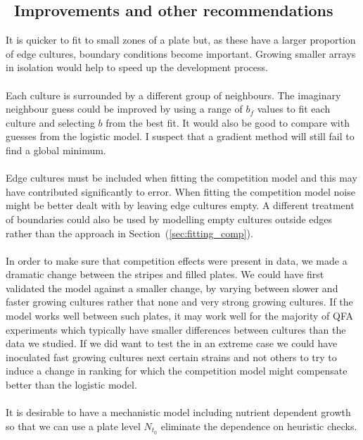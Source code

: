 \subsection{\thesubsection~Improvements and other recommendations}

It is quicker to fit to small zones of a plate but, as these have a
larger proportion of edge cultures, boundary conditions become
important. Growing smaller arrays in isolation would help to speed up
the development process.
\\\\
Each culture is surrounded by a different group of neighbours. The
imaginary neighbour guess could be improved by using a range of
\(b_{f}\) values to fit each culture and selecting \(b\) from the best
fit. It would also be good to compare with guesses from the logistic
model. I suspect that a gradient method will still fail to find a
global minimum.
\\\\
Edge cultures must be included when fitting the competition model and
this may have contributed significantly to error. When fitting the
competition model noise might be better dealt with by leaving edge
cultures empty. A different treatment of boundaries could also be used
by modelling empty cultures outside edges rather than the approach in
Section~(\ref{sec:fitting_comp}).
\\\\
In order to make sure that competition effects were present in data,
we made a dramatic change between the stripes and filled plates. We
could have first validated the model against a smaller change, by
varying between slower and faster growing cultures rather that none
and very strong growing cultures. If the model works well between such
plates, it may work well for the majority of QFA experiments which
typically have smaller differences between cultures than the data we
studied. If we did want to test the in an extreme case we could have
inoculated fast growing cultures next certain strains and not others
to try to induce a change in ranking for which the competition model
might compensate better than the logistic model.
\\\\
It is desirable to have a mechanistic model including nutrient
dependent growth so that we can use a plate level \(N_{t_{0}}\)
eliminate the dependence on heuristic checks.

